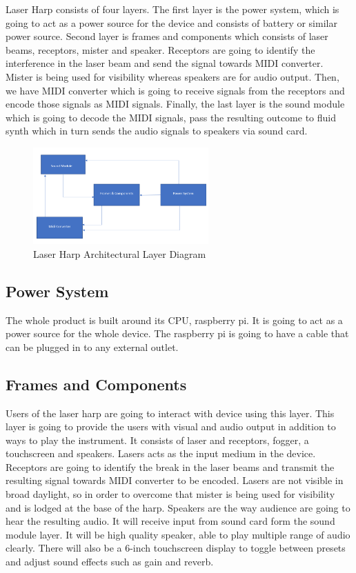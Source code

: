 Laser Harp consists of four layers. The first layer is the power system, which is going to act as a power source for the device and consists of battery or similar power source. Second layer is frames and components which consists of laser beams, receptors, mister and speaker. Receptors are going to identify the interference in the laser beam and send the signal towards MIDI converter. Mister is being used for visibility whereas speakers are for audio output. Then, we have MIDI converter which is going to receive signals from the receptors and encode those signals as MIDI signals. Finally, the last layer is the sound module which is going to decode the MIDI signals, pass the resulting outcome to fluid synth which in turn sends the audio signals to speakers via sound card. 

\begin{figure}[h!]
	\centering
 	\includegraphics[width=0.60\textwidth]{images/layers}
 \caption{Laser Harp Architectural Layer Diagram}
\end{figure}

\subsection{Power System}
The whole product is built around its CPU, raspberry pi. It is going to act as a power source for the whole device. The raspberry pi is going to have a cable that can be plugged in to any external outlet.


\subsection{Frames and Components}
Users of the laser harp are going to interact with device using this layer. This layer is going to provide the users with visual and audio output in addition to ways to play the instrument. It consists of laser and receptors, fogger, a touchscreen and speakers. Lasers acts as  the input medium in the device. Receptors are going to identify the break in the laser beams and transmit the resulting signal towards MIDI converter to be encoded. Lasers are not visible in broad daylight, so  in order to overcome that mister is being used for visibility and is lodged at the base of the harp. Speakers are the way audience are going to hear the resulting audio. It will receive input from sound card form the sound module layer. It will be high quality speaker, able to play multiple range of audio clearly. There will also be a 6-inch touchscreen display to toggle between presets and adjust sound effects such as gain and reverb.

